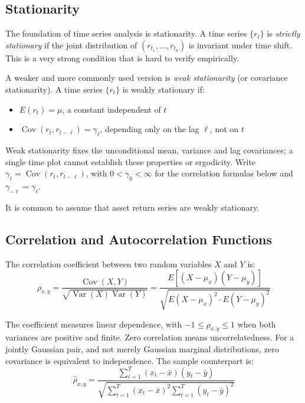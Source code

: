 \subsection{Stationarity}

The foundation of time series analysis is stationarity. A time series $\{r_t\}$ is \textit{strictly stationary} if the joint distribution of $(r_{t_1}, \ldots, r_{t_k})$ is invariant under time shift. This is a very strong condition that is hard to verify empirically.

A weaker and more commonly used version is \textit{weak stationarity} (or covariance stationarity). A time series $\{r_t\}$ is weakly stationary if:
\begin{itemize}
    \item[(a)] $E(r_t) = \mu$, a constant independent of $t$
    \item[(b)] $\operatorname{Cov}(r_t, r_{t-\ell}) = \gamma_\ell$, depending only on the lag $\ell$, not on $t$
\end{itemize}

Weak stationarity fixes the unconditional mean, variance and lag
covariances; a single time plot cannot establish these properties or
ergodicity. Write $\gamma_\ell=\operatorname{Cov}(r_t,r_{t-\ell})$,
with $0<\gamma_0<\infty$ for the correlation formulas below and
$\gamma_{-\ell}=\gamma_\ell$.

It is common to assume that asset return series are weakly stationary.
\subsection{Correlation and Autocorrelation Functions}\label{sec:acf}

\begin{definition}
The correlation coefficient between two random variables $X$ and $Y$ is:
$$\rho_{x,y} = \frac{\operatorname{Cov}(X,Y)}{\sqrt{\operatorname{Var}(X)\operatorname{Var}(Y)}} = \frac{E[(X-\mu_x)(Y-\mu_y)]}{\sqrt{E(X-\mu_x)^2 \cdot E(Y-\mu_y)^2}}$$
\end{definition}

The coefficient measures linear dependence, with
$-1\le\rho_{x,y}\le1$ when both variances are positive and finite.
Zero correlation means uncorrelatedness. For a jointly Gaussian
pair, and not merely Gaussian marginal distributions, zero covariance
is equivalent to independence. The sample counterpart is:
$$\hat{\rho}_{x,y} = \frac{\sum_{t=1}^T (x_t - \bar{x})(y_t - \bar{y})}{\sqrt{\sum_{t=1}^T (x_t - \bar{x})^2 \sum_{t=1}^T (y_t - \bar{y})^2}}$$


